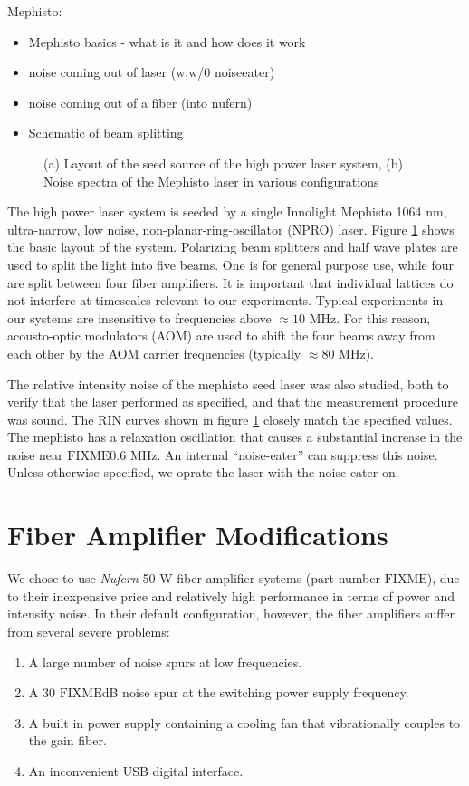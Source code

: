 \documentclass[twocolumn,aps,pra,showpacs,preprintnumbers,bibnotes]{revtex4-1}
\newcommand\FIXME{{\color{red}\ensuremath{\mathrm{FIXME}}}}
\begin{document}
Mephisto:
\begin{itemize}
	\item Mephisto basics - what is it and how does it work
	\item noise coming out of laser (w,w/0 noiseeater)
	\item noise coming out of a fiber (into nufern)
	\item Schematic of beam splitting
\end{itemize}

\begin{figure}
    \caption{(a) Layout of the seed source of the high power laser system, (b) Noise spectra of the Mephisto laser in various configurations}\label{fig:seed}
\end{figure}

The high power laser system is seeded by a single Innolight Mephisto 1064 nm, ultra-narrow, low noise, non-planar-ring-oscillator (NPRO) laser. Figure \ref{fig:seed} shows the basic layout of the system. Polarizing beam splitters and half wave plates are used to split the light into five beams. One is for general purpose use, while four are split between four fiber amplifiers. It is important that individual lattices do not interfere at timescales relevant to our experiments. Typical experiments in our systems are insensitive to frequencies above $\approx 10$ MHz. For this reason, acousto-optic modulators (AOM) are used to shift the four beams away from each other by the AOM carrier frequencies (typically $\approx 80$ MHz). 

The relative intensity noise of the mephisto seed laser was also studied, both to verify that the laser performed as specified, and that the measurement procedure was sound. The RIN curves shown in figure \ref{fig:seed} closely match the specified values. The mephisto has a relaxation oscillation that causes a substantial increase in the noise near \FIXME 0.6 MHz. An internal ``noise-eater'' can suppress this noise. Unless otherwise specified, we oprate the laser with the noise eater on.

\section{Fiber Amplifier Modifications}
We chose to use \textit{Nufern} 50 W fiber amplifier systems (part number \FIXME), due to their inexpensive price and relatively high performance in terms of power and intensity noise. In their default configuration, however, the fiber amplifiers suffer from several severe problems:
\begin{enumerate}
    \item A large number of noise spurs at low frequencies.
    \item A 30 \FIXME dB noise spur at the switching power supply frequency.
    \item A built in power supply containing a cooling fan that vibrationally couples to the gain fiber.
    \item An inconvenient USB digital interface.
\end{enumerate}
\end{document}
